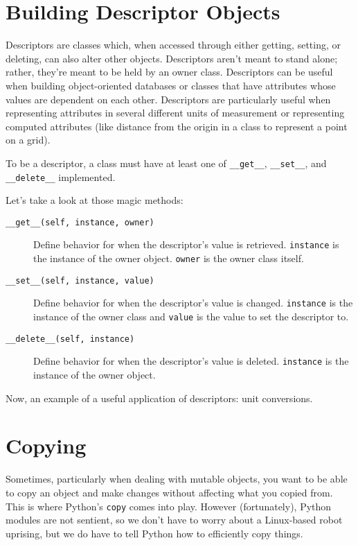 \documentclass[a4paper,11pt]{article}
\newcommand{\code}[1]{\texttt{#1}}
\begin{document}
\section{Building Descriptor Objects}

Descriptors are classes which, when accessed through either getting, setting, or deleting, can also alter other objects. Descriptors aren't meant to stand alone; rather, they're meant to be held by an owner class. Descriptors can be useful when building object-oriented databases or classes that have attributes whose values are dependent on each other. Descriptors are particularly useful when representing attributes in several different units of measurement or representing computed attributes (like distance from the origin in a class to represent a point on a grid).

To be a descriptor, a class must have at least one of \code{__get__}, \code{__set__}, and \code{__delete__} implemented. 

Let's take a look at those magic methods:

\begin{description}

\item[\code{__get__(self, instance, owner)}]
Define behavior for when the descriptor's value is retrieved. \code{instance} is the instance of the owner object. \code{owner} is the owner class itself.

\item[\code{__set__(self, instance, value)}]
Define behavior for when the descriptor's value is changed. \code{instance} is the instance of the owner class and \code{value} is the value to set the descriptor to.

\item[\code{__delete__(self, instance)}]
Define behavior for when the descriptor's value is deleted. \code{instance} is the instance of the owner object.

\end{description}

\noindent
Now, an example of a useful application of descriptors: unit conversions.



\section{Copying}

Sometimes, particularly when dealing with mutable objects, you want to be able to copy an object and make changes without affecting what you copied from. This is where Python's \code{copy} comes into play. However (fortunately), Python modules are not sentient, so we don't have to worry about a Linux-based robot uprising, but we do have to tell Python how to efficiently copy things.
\end{document}

